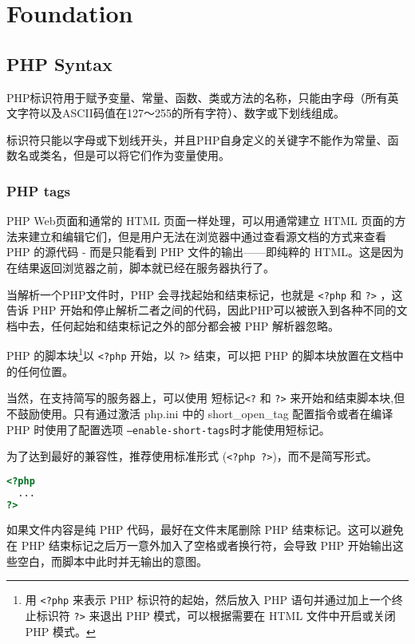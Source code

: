 \part{Foundation}


\chapter{PHP Syntax}


PHP标识符用于赋予变量、常量、函数、类或方法的名称，只能由字母（所有英文字符以及ASCII码值在127～255的所有字符）、数字或下划线组成。

标识符只能以字母或下划线开头，并且PHP自身定义的关键字不能作为常量、函数名或类名，但是可以将它们作为变量使用。



\section{PHP tags}



PHP Web页面和通常的 HTML 页面一样处理，可以用通常建立 HTML 页面的方法来建立和编辑它们，但是用户无法在浏览器中通过查看源文档的方式来查看 PHP 的源代码 - 而是只能看到 PHP 文件的输出——即纯粹的 HTML。这是因为在结果返回浏览器之前，脚本就已经在服务器执行了。

当解析一个PHP文件时，PHP 会寻找起始和结束标记，也就是 \texttt{<?php} 和 \texttt{?>} ，这告诉 PHP 开始和停止解析二者之间的代码，因此PHP可以被嵌入到各种不同的文档中去，任何起始和结束标记之外的部分都会被 PHP 解析器忽略。


PHP 的脚本块\footnote{用 \texttt{<?php} 来表示 PHP 标识符的起始，然后放入 PHP 语句并通过加上一个终止标识符 \texttt{?>} 来退出 PHP 模式，可以根据需要在 HTML 文件中开启或关闭 PHP 模式。}以 \texttt{<?php} 开始，以 \texttt{?>} 结束，可以把 PHP 的脚本块放置在文档中的任何位置。

当然，在支持简写的服务器上，可以使用 短标记\texttt{<?} 和 \texttt{?>} 来开始和结束脚本块,但不鼓励使用。只有通过激活 php.ini 中的 short\_open\_tag 配置指令或者在编译 PHP 时使用了配置选项 \texttt{--enable-short-tags}时才能使用短标记。

为了达到最好的兼容性，推荐使用标准形式 (\texttt{<?php ?>})，而不是简写形式。

\begin{lstlisting}[language=PHP]
<?php
  ...
?>
\end{lstlisting}

如果文件内容是纯 PHP 代码，最好在文件末尾删除 PHP 结束标记。这可以避免在 PHP 结束标记之后万一意外加入了空格或者换行符，会导致 PHP 开始输出这些空白，而脚本中此时并无输出的意图。

